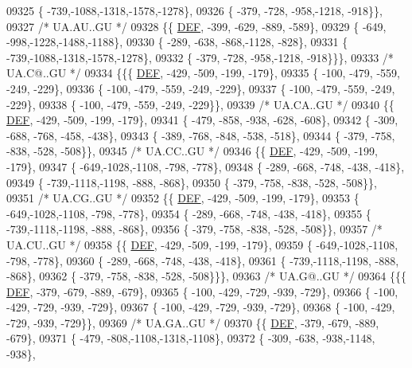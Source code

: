\begin{DoxyCode}
09325 \{ -739,-1088,-1318,-1578,-1278\},
09326 \{ -379, -728, -958,-1218, -918\}\},
09327 \textcolor{comment}{/* UA.AU..GU */}
09328 \{\{  \mbox{\hyperlink{1_88_84__epars_8h_a397419fc12b37ed479c8abb9d444d843}{DEF}}, -399, -629, -889, -589\},
09329 \{ -649, -998,-1228,-1488,-1188\},
09330 \{ -289, -638, -868,-1128, -828\},
09331 \{ -739,-1088,-1318,-1578,-1278\},
09332 \{ -379, -728, -958,-1218, -918\}\}\},
09333 \textcolor{comment}{/* UA.C@..GU */}
09334 \{\{\{  \mbox{\hyperlink{1_88_84__epars_8h_a397419fc12b37ed479c8abb9d444d843}{DEF}}, -429, -509, -199, -179\},
09335 \{ -100, -479, -559, -249, -229\},
09336 \{ -100, -479, -559, -249, -229\},
09337 \{ -100, -479, -559, -249, -229\},
09338 \{ -100, -479, -559, -249, -229\}\},
09339 \textcolor{comment}{/* UA.CA..GU */}
09340 \{\{  \mbox{\hyperlink{1_88_84__epars_8h_a397419fc12b37ed479c8abb9d444d843}{DEF}}, -429, -509, -199, -179\},
09341 \{ -479, -858, -938, -628, -608\},
09342 \{ -309, -688, -768, -458, -438\},
09343 \{ -389, -768, -848, -538, -518\},
09344 \{ -379, -758, -838, -528, -508\}\},
09345 \textcolor{comment}{/* UA.CC..GU */}
09346 \{\{  \mbox{\hyperlink{1_88_84__epars_8h_a397419fc12b37ed479c8abb9d444d843}{DEF}}, -429, -509, -199, -179\},
09347 \{ -649,-1028,-1108, -798, -778\},
09348 \{ -289, -668, -748, -438, -418\},
09349 \{ -739,-1118,-1198, -888, -868\},
09350 \{ -379, -758, -838, -528, -508\}\},
09351 \textcolor{comment}{/* UA.CG..GU */}
09352 \{\{  \mbox{\hyperlink{1_88_84__epars_8h_a397419fc12b37ed479c8abb9d444d843}{DEF}}, -429, -509, -199, -179\},
09353 \{ -649,-1028,-1108, -798, -778\},
09354 \{ -289, -668, -748, -438, -418\},
09355 \{ -739,-1118,-1198, -888, -868\},
09356 \{ -379, -758, -838, -528, -508\}\},
09357 \textcolor{comment}{/* UA.CU..GU */}
09358 \{\{  \mbox{\hyperlink{1_88_84__epars_8h_a397419fc12b37ed479c8abb9d444d843}{DEF}}, -429, -509, -199, -179\},
09359 \{ -649,-1028,-1108, -798, -778\},
09360 \{ -289, -668, -748, -438, -418\},
09361 \{ -739,-1118,-1198, -888, -868\},
09362 \{ -379, -758, -838, -528, -508\}\}\},
09363 \textcolor{comment}{/* UA.G@..GU */}
09364 \{\{\{  \mbox{\hyperlink{1_88_84__epars_8h_a397419fc12b37ed479c8abb9d444d843}{DEF}}, -379, -679, -889, -679\},
09365 \{ -100, -429, -729, -939, -729\},
09366 \{ -100, -429, -729, -939, -729\},
09367 \{ -100, -429, -729, -939, -729\},
09368 \{ -100, -429, -729, -939, -729\}\},
09369 \textcolor{comment}{/* UA.GA..GU */}
09370 \{\{  \mbox{\hyperlink{1_88_84__epars_8h_a397419fc12b37ed479c8abb9d444d843}{DEF}}, -379, -679, -889, -679\},
09371 \{ -479, -808,-1108,-1318,-1108\},
09372 \{ -309, -638, -938,-1148, -938\},

\end{DoxyCode}
